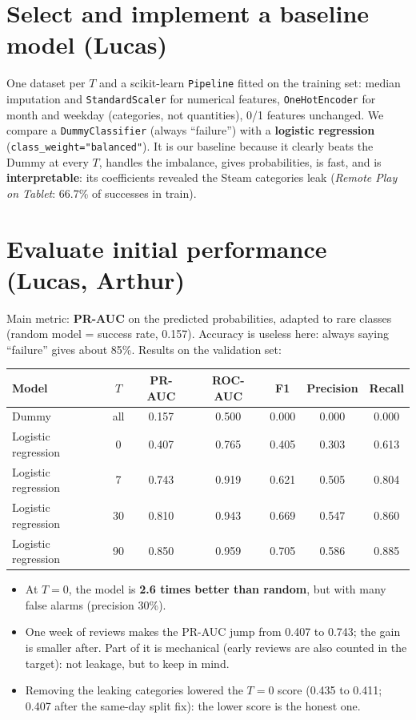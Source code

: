 \documentclass[11pt,a4paper]{article}
\newcommand{\code}[1]{\texttt{#1}}
\begin{document}
\section{Select and implement a baseline model (Lucas)}

One dataset per $T$ and a scikit-learn \code{Pipeline} fitted on the training set: median imputation and \code{StandardScaler} for numerical features,
\code{OneHotEncoder} for month and weekday (categories, not quantities), 0/1 features unchanged.
We compare a \code{DummyClassifier} (always ``failure'') with a \textbf{logistic regression} (\code{class\_weight="balanced"}).
It is our baseline because it clearly beats the Dummy at every $T$, handles the imbalance, gives probabilities, is fast,
and is \textbf{interpretable}: its coefficients revealed the Steam categories leak (\emph{Remote Play on Tablet}: 66.7\% of successes in train).

\section{Evaluate initial performance (Lucas, Arthur)}

Main metric: \textbf{PR-AUC} on the predicted probabilities, adapted to rare classes (random model = success rate, 0.157).
Accuracy is useless here: always saying ``failure'' gives about 85\%. Results on the validation set:

\begin{center}
\small
\begin{tabular}{l c c c c c c}
\toprule
Model & $T$ & PR-AUC & ROC-AUC & F1 & Precision & Recall \\
\midrule
Dummy & all & 0.157 & 0.500 & 0.000 & 0.000 & 0.000 \\
Logistic regression & 0  & 0.407 & 0.765 & 0.405 & 0.303 & 0.613 \\
Logistic regression & 7  & 0.743 & 0.919 & 0.621 & 0.505 & 0.804 \\
Logistic regression & 30 & 0.810 & 0.943 & 0.669 & 0.547 & 0.860 \\
Logistic regression & 90 & 0.850 & 0.959 & 0.705 & 0.586 & 0.885 \\
\bottomrule
\end{tabular}
\end{center}

\begin{itemize}
  \item At $T = 0$, the model is \textbf{2.6 times better than random}, but with many false alarms (precision 30\%).
  \item One week of reviews makes the PR-AUC jump from 0.407 to 0.743; the gain is smaller after.
        Part of it is mechanical (early reviews are also counted in the target): not leakage, but to keep in mind.
  \item Removing the leaking categories lowered the $T = 0$ score (0.435 to 0.411; 0.407 after the same-day split fix): the lower score is the honest one.
\end{itemize}
\end{document}
